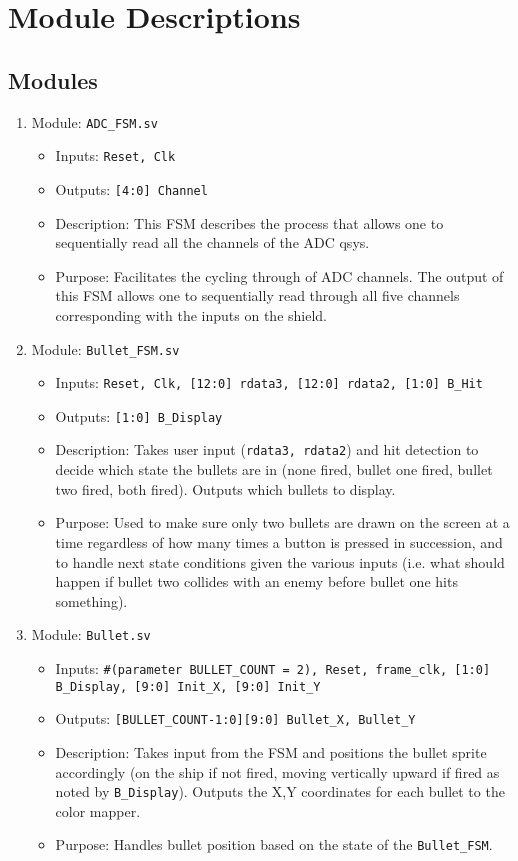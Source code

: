 \section{Module Descriptions}
\subsection{Modules}

\raggedright
\begin{enumerate}
  \item Module: \texttt{ADC\_FSM.sv}
  \begin{itemize}
    \item Inputs: \texttt{Reset, Clk}
    \item Outputs: \texttt{[4:0] Channel}
    \item Description: This FSM describes the process that allows one to sequentially read all the channels of the ADC qsys.
    \item Purpose: Facilitates the cycling through of ADC channels.
    The output of this FSM allows one to sequentially read through all five channels corresponding with the inputs on the shield.
  \end{itemize}

  \item Module: \texttt{Bullet\_FSM.sv}
  \begin{itemize}
    \item Inputs: \texttt{Reset, Clk, [12:0] rdata3, [12:0] rdata2, [1:0] B\_Hit}
    \item Outputs: \texttt{[1:0] B\_Display}
    \item Description: Takes user input (\texttt{rdata3, rdata2}) and hit detection to decide which state the bullets are in (none fired, bullet one fired, bullet two fired, both fired). Outputs which bullets to display.
    \item Purpose: Used to make sure only two bullets are drawn on the screen at a time regardless of how many times a button is pressed in succession, and to handle next state conditions given the various inputs (i.e. what should happen if bullet two collides with an enemy before bullet one hits something).
  \end{itemize}

  \item Module: \texttt{Bullet.sv}
  \begin{itemize}
    \item Inputs: \texttt{\#(parameter BULLET\_COUNT = 2), Reset, frame\_clk, [1:0] B\_Display, [9:0] Init\_X, [9:0] Init\_Y}
    \item Outputs: \texttt{[BULLET\_COUNT-1:0][9:0] Bullet\_X, Bullet\_Y}
    \item Description: Takes input from the FSM and positions the bullet sprite accordingly (on the ship if not fired, moving vertically upward if fired as noted by \texttt{B\_Display}). Outputs the X,Y coordinates for each bullet to the color mapper.
    \item Purpose: Handles bullet position based on the state of the \texttt{Bullet\_FSM}.
  \end{itemize}


\end{enumerate}
